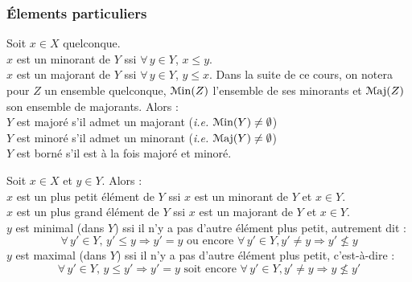 		
		\subsubsection{\'Elements particuliers}
			
			\pagebreak
			\begin{Definitions}
				Soit \(x \in X\) quelconque. \\
					 \bdot \(x\) est un minorant de \(Y\) ssi \(\forall \,y \in Y\), \(x \leqslant y\). \\
					 \bdot \(x\) est un majorant de \(Y\) ssi \(\forall \,y \in Y\), \(y \leqslant x\). \nt
				Dans la suite de ce cours, on notera pour \(Z\) un ensemble quelconque, \(\EuScript{M}\mathrm{in}(Z)\) l'ensemble de ses minorants et \(\EuScript{M}\mathrm{aj}(Z)\) son ensemble de majorants. Alors : \\
					 \bdot \(Y\) est majoré s'il admet un majorant (\emph{i.e.} \(\EuScript{M}\mathrm{in}(Y) \neq \emptyset\)) \\
					 \bdot \(Y\) est minoré s'il admet un minorant (\emph{i.e.} \(\EuScript{M}\mathrm{aj}(Y) \neq \emptyset\)) \\
					 \bdot \(Y\) est borné s'il est à la fois majoré et minoré.
			\end{Definitions}
			
			\eqskip{2mm}
			\begin{Definitions}
				Soit \(x \in X\) et \(y\in Y\). Alors : \\
					 \bdot \(x\) est un plus petit élément de \(Y\) ssi \(x\) est un minorant de \(Y\) et \(x \in Y\). \\
					 \bdot \(x\) est un plus grand élément de \(Y\) ssi \(x\) est un majorant de \(Y\) et \(x \in Y\). \\
					 \bdot \(y\) est minimal (dans \(Y\)) ssi il n'y a pas d'autre élément plus petit, autrement dit :
					\[
						\forall \,y' \in Y,\, y' \leqslant y \Longrightarrow y' = y \text{ ou encore } \forall \,y' \in Y, y' \neq y \Longrightarrow y' \nleqslant y
					\]
					 \bdot \(y\) est maximal (dans \(Y\)) ssi il n'y a pas d'autre élément plus petit, c'est-à-dire :
				\[
					\forall \,y' \in Y,\, y \leqslant y' \Longrightarrow y' = y \text{ soit encore } \forall \,y' \in Y, y' \neq y \Longrightarrow y \nleqslant y'
				\]
			\end{Definitions}
			
